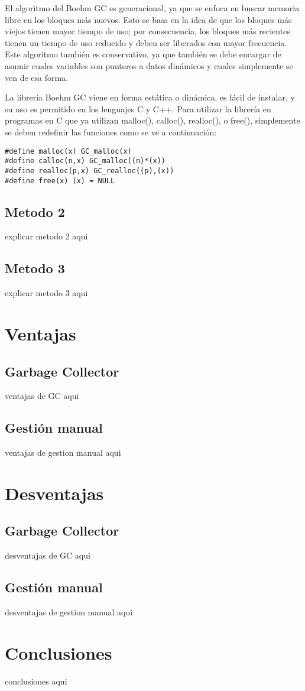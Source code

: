 \documentclass[11pt]{article} %
\begin{document}
	El algoritmo del Boehm GC es generacional, ya que se enfoca en buscar memoria libre en los bloques más nuevos. Esto se basa en la idea de que los bloques más viejos tienen mayor tiempo de uso; por consecuencia, los bloques más recientes tienen un tiempo de uso reducido y deben ser liberados con mayor frecuencia. Este algoritmo también es conservativo, ya que también se debe encargar de asumir cuales variables son punteros a datos dinámicos y cuales simplemente se ven de esa forma.

	La librería Boehm GC viene en forma estática o dinámica, es fácil de instalar, y su uso es permitido en los lenguajes C y C++. Para utilizar la librería en programas en C que ya utilizan malloc(), calloc(), realloc(), o free(), simplemente se deben redefinir las funciones como se ve a continuación:
\lstset{language=C}          %

\begin{lstlisting}[frame=single]  % Start your code-block
#define malloc(x) GC_malloc(x)
#define calloc(n,x) GC_malloc((n)*(x))
#define realloc(p,x) GC_realloc((p),(x))
#define free(x) (x) = NULL
\end{lstlisting}

\subsection{Metodo 2}
explicar metodo 2 aqui

\subsection{Metodo 3}
explicar metodo 3 aqui

\section{Ventajas}

\subsection{Garbage Collector}

ventajas de GC aqui

\subsection{Gestión manual}

ventajas de gestion manual aqui

\section{Desventajas}

\subsection{Garbage Collector}

desventajas de GC aqui

\subsection{Gestión manual}

desventajas de gestion manual aqui

\section{Conclusiones}

conclusiones aqui
\end{document}
